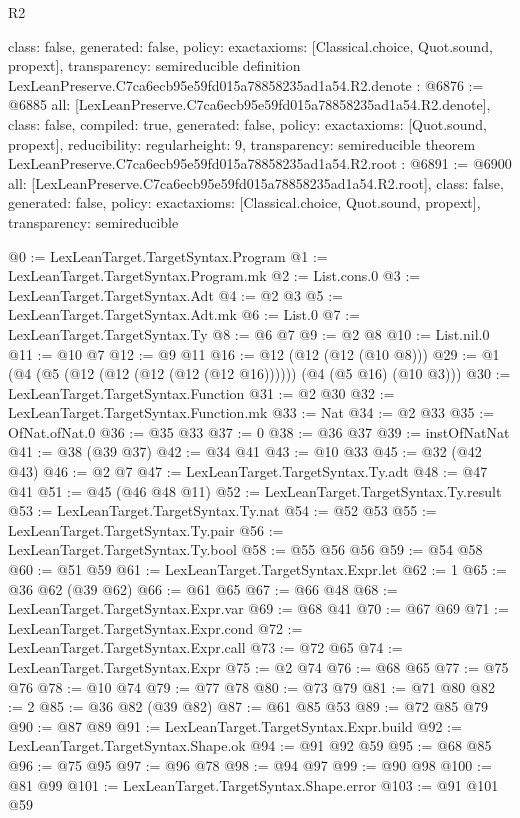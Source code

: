 \begin{lexlean}{R2}
\begin{coremodule}
{  class: false,
  generated: false,
  policy: exact{axioms: [Classical.choice, Quot.sound, propext]},
  transparency: semireducible
}
definition LexLeanPreserve.C7ca6ecb95e59fd015a78858235ad1a54.R2.denote : @6876 := @6885 {
  all: [LexLeanPreserve.C7ca6ecb95e59fd015a78858235ad1a54.R2.denote],
  class: false,
  compiled: true,
  generated: false,
  policy: exact{axioms: [Quot.sound, propext]},
  reducibility: regular{height: 9},
  transparency: semireducible
}
theorem LexLeanPreserve.C7ca6ecb95e59fd015a78858235ad1a54.R2.root : @6891 := @6900 {
  all: [LexLeanPreserve.C7ca6ecb95e59fd015a78858235ad1a54.R2.root],
  class: false,
  generated: false,
  policy: exact{axioms: [Classical.choice, Quot.sound, propext]},
  transparency: semireducible
}

@0 := LexLeanTarget.TargetSyntax.Program
@1 := LexLeanTarget.TargetSyntax.Program.mk
@2 := List.cons.{0}
@3 := LexLeanTarget.TargetSyntax.Adt
@4 := @2 @3
@5 := LexLeanTarget.TargetSyntax.Adt.mk
@6 := List.{0}
@7 := LexLeanTarget.TargetSyntax.Ty
@8 := @6 @7
@9 := @2 @8
@10 := List.nil.{0}
@11 := @10 @7
@12 := @9 @11
@16 := @12 (@12 (@12 (@10 @8)))
@29 := @1 (@4 (@5 (@12 (@12 (@12 (@12 (@12 @16)))))) (@4 (@5 @16) (@10 @3)))
@30 := LexLeanTarget.TargetSyntax.Function
@31 := @2 @30
@32 := LexLeanTarget.TargetSyntax.Function.mk
@33 := Nat
@34 := @2 @33
@35 := OfNat.ofNat.{0}
@36 := @35 @33
@37 := 0
@38 := @36 @37
@39 := instOfNatNat
@41 := @38 (@39 @37)
@42 := @34 @41
@43 := @10 @33
@45 := @32 (@42 @43)
@46 := @2 @7
@47 := LexLeanTarget.TargetSyntax.Ty.adt
@48 := @47 @41
@51 := @45 (@46 @48 @11)
@52 := LexLeanTarget.TargetSyntax.Ty.result
@53 := LexLeanTarget.TargetSyntax.Ty.nat
@54 := @52 @53
@55 := LexLeanTarget.TargetSyntax.Ty.pair
@56 := LexLeanTarget.TargetSyntax.Ty.bool
@58 := @55 @56 @56
@59 := @54 @58
@60 := @51 @59
@61 := LexLeanTarget.TargetSyntax.Expr.let
@62 := 1
@65 := @36 @62 (@39 @62)
@66 := @61 @65
@67 := @66 @48
@68 := LexLeanTarget.TargetSyntax.Expr.var
@69 := @68 @41
@70 := @67 @69
@71 := LexLeanTarget.TargetSyntax.Expr.cond
@72 := LexLeanTarget.TargetSyntax.Expr.call
@73 := @72 @65
@74 := LexLeanTarget.TargetSyntax.Expr
@75 := @2 @74
@76 := @68 @65
@77 := @75 @76
@78 := @10 @74
@79 := @77 @78
@80 := @73 @79
@81 := @71 @80
@82 := 2
@85 := @36 @82 (@39 @82)
@87 := @61 @85 @53
@89 := @72 @85 @79
@90 := @87 @89
@91 := LexLeanTarget.TargetSyntax.Expr.build
@92 := LexLeanTarget.TargetSyntax.Shape.ok
@94 := @91 @92 @59
@95 := @68 @85
@96 := @75 @95
@97 := @96 @78
@98 := @94 @97
@99 := @90 @98
@100 := @81 @99
@101 := LexLeanTarget.TargetSyntax.Shape.error
@103 := @91 @101 @59

\end{coremodule}
\end{lexlean}
